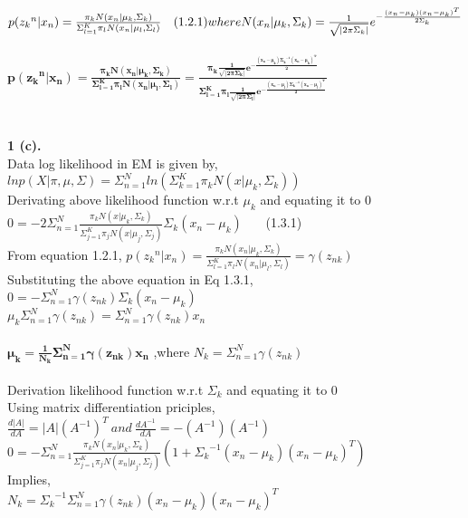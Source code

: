 \documentclass{article}
\begin{document}
$p({z_k}^n|x_n)=\frac{\pi_k N(x_n|\mu_k,\Sigma_k)}{\Sigma_{l=1}^{K}\pi_l N(x_n|\mu_l,\Sigma_l)} \ \ \ (1.2.1)\\
where N(x_n|\mu_k,\Sigma_k)=\frac{1}{\sqrt{|2\pi\Sigma_k|}}e^{-\frac{(x_n-\mu_k)(x_n-\mu_k)^T}{2\Sigma_k}}$\\
\\
$\mathbf{p({z_k}^n|x_n)=\frac{\pi_k N(x_n|\mu_k,\Sigma_k)}{\Sigma_{l=1}^{K}\pi_l N(x_n|\mu_l,\Sigma_l)}= \frac{\pi_k \frac{1}{\sqrt{|2\pi\Sigma_k|}}e^{-\frac{(x_n-\mu_k){\Sigma_k}^{-1}(x_n-\mu_k)^T}{2}}}{\Sigma_{l=1}^{K}\pi_l \frac{1}{\sqrt{|2\pi\Sigma_l|}}e^{-\frac{(x_n-\mu_l){\Sigma_k}^{-1}(x_n-\mu_l)^T}{2}}}}$\\
\\
\\
\textbf{1 (c).}\\
Data log likelihood in EM is given by,\\
$lnp(X|\pi,\mu,\Sigma)=\Sigma_{n=1}^Nln(\Sigma_{k=1}^K\pi_kN(x|\mu_k,\Sigma_k))$\\
Derivating above likelihood function w.r.t $\mu_k$ and equating it to 0\\
$0= -2\Sigma_{n=1}^N\frac{\pi_kN(x|\mu_k,\Sigma_k)}{\Sigma_{j=1}^K \pi_j N(x|\mu_j,\Sigma_j)}\Sigma_k(x_n-\mu_k)$ \ \ \ (1.3.1)\\
From equation 1.2.1, $p({z_k}^n|x_n)=\frac{\pi_k N(x_n|\mu_k,\Sigma_k)}{\Sigma_{l=1}^{K}\pi_l N(x_n|\mu_l,\Sigma_l)} = \gamma(z_{nk})$\\
Substituting the above equation in Eq 1.3.1,\\
$0= -\Sigma_{n=1}^N \gamma(z_{nk})\Sigma_k(x_n-\mu_k)$\\
$\mu_k\Sigma_{n=1}^N \gamma(z_{nk})=\Sigma_{n=1}^N \gamma(z_{nk})x_n$\\
\\$\mathbf{\mu_k=\frac{1}{N_k}\Sigma_{n=1}^N \gamma(z_{nk})x_n}$ ,where $N_k=\Sigma_{n=1}^N \gamma(z_{nk})$\\
\\Derivation likelihood function w.r.t $\Sigma_k$ and equating it to 0\\
Using matrix differentiation priciples, $\frac{d|A|}{dA}=|A|(A^{-1})^T \  and \  \frac{dA^{-1}}{dA}=-(A^{-1})(A^{-1})$\\
$0=-\Sigma_{n=1}^N \frac{\pi_kN(x_n|\mu_k,\Sigma_k)}{\Sigma_{j=1}^K \pi_j N(x_n|\mu_j,\Sigma_j)}(1+{\Sigma_k}^{-1}(x_n-\mu_k)(x_n-\mu_k)^T)$\\
Implies,\\
$N_k={\Sigma_k}^{-1}\Sigma_{n=1}^N\gamma(z_{nk})(x_n-\mu_k)(x_n-\mu_k)^T $\\
\end{document}
